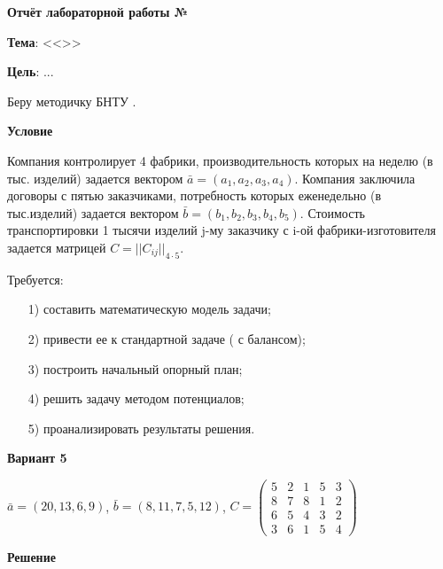 \begin{center}
  \textbf{Отчёт лабораторной работы №\envReportLabNumber}
\end{center}

\textbf{Тема}:
<<\envReportTitle>>

\textbf{Цель}: ...


Беру методичку БНТУ \cite{MethodBntu}.

\begin{center}
  \textbf{Условие}
\end{center}

Компания контролирует 4 фабрики, производительность которых на неделю (в тыс. изделий) задается вектором $\bar{a} = (a_1, a_2 , a_3 , a_4 )$.
Компания заключила договоры с пятью заказчиками, потребность которых еженедельно (в тыс.изделий) задается вектором $\bar{b} = (b_1 , b_2 , b_3 , b_4 , b_5)$.
Стоимость транспортировки 1 тысячи изделий j-му заказчику  с i-ой фабрики-изготовителя задается матрицей $C = ||C_{ij}||_{4 \cdot 5}$.

Требуется:

\begin{enumerate}
  \item[1)] составить математическую модель задачи;
  \item[2)] привести ее к стандартной задаче ( с балансом);
  \item[3)] построить начальный опорный план;
  \item[4)] решить задачу методом потенциалов;
  \item[5)] проанализировать результаты решения.
\end{enumerate}

\begin{center}
  \textbf{Вариант 5}
\end{center}

$\bar{a} = (20,13,6,9)$, $\bar{b} = (8,11,7,5,12)$, $C= \begin{pmatrix}
  5&2&1&5&3\\
  8&7&8&1&2\\
  6&5&4&3&2\\
  3&6&1&5&4
\end{pmatrix}$

\begin{center}
  \textbf{Решение}
\end{center}

